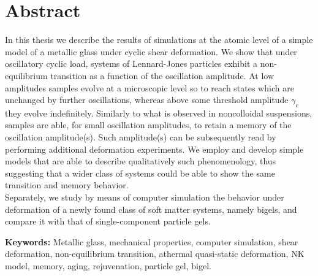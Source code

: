 

\clearpage
\chapter*{Abstract}

In this thesis we describe the results of simulations at the atomic level of a simple model of a metallic glass under cyclic shear deformation.
We show that under oscillatory cyclic load, systems of Lennard-Jones particles exhibit a non-equilibrium transition as a function of the oscillation amplitude. At low amplitudes samples evolve at a microscopic level so to reach states which are unchanged by further oscillations, whereas above some threshold amplitude $\gamma_{c}$ they evolve indefinitely. 
Similarly to what is observed in noncolloidal suspensions, samples are able, for small oscillation amplitudes, to retain a memory of the oscillation amplitude(s). Such amplitude(s) can be subsequently read by performing additional deformation experiments.
We employ and develop simple models that are able to describe qualitatively such phenomenology, thus suggesting that a wider class of systems could be able to show the same transition and memory behavior.\\
Separately, we study by means of computer simulation the behavior under deformation of a newly found class of soft matter systems, namely bigels, and compare it with that of single-component particle gels.

\vspace{2cm}

\textbf{Keywords:} Metallic glass, mechanical properties, computer simulation, shear deformation, non-equilibrium transition, athermal quasi-static deformation, NK model, memory, aging, rejuvenation, particle gel, bigel.

